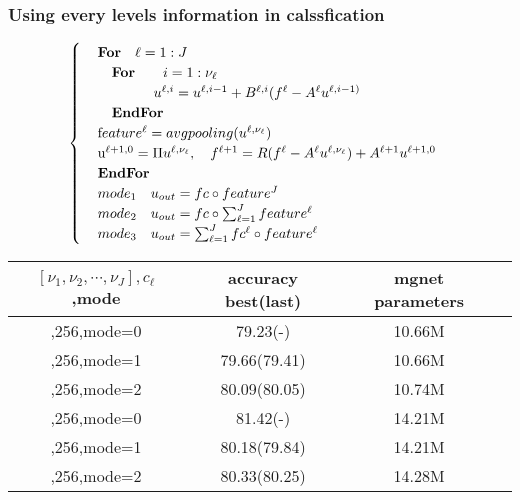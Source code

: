 \subsubsection{Using every levels information in calssfication}
\begin{equation}\label{eq:densenet}
\begin{cases}
\quad\text{\bf For}\quad \ell = 1:J\\
\quad\quad\text{\bf For}\quad\quad i = 1: \nu_{\ell}\\
\quad\text\quad\quad\quad\quad u^{\ell,i} = u^{\ell,i-1} + B^{\ell,i}(f^{\ell}-A^{\ell}u^{\ell,i-1)}\\
\quad\quad\text{\bf EndFor} \\
\quad\text feature^{\ell} = avgpooling(u^{\ell,\nu_{\ell}})\\
\quad\text u^{\ell+1,0}=\Pi u^{\ell,\nu_{\ell}},\quad f^{\ell+1}=R(f^{\ell}-A^{\ell}u^{\ell,\nu_{\ell}})+A^{\ell+1}u^{\ell+1,0}\\
\quad\text{\bf EndFor} \\
\quad mode_1 \quad u_{out}=fc\circ feature^{J}\\
\quad mode_2 \quad u_{out}=fc\circ \sum_{\ell=1}^{J}feature^{\ell}\\
\quad mode_3 \quad u_{out}= \sum_{\ell=1}^{J}fc^{\ell}\circ feature^{\ell}\\
\end{cases}
\end{equation}

\begin{table}[!htbp]
	\begin{center}
			\begin{tabular}{|c|c|c|c|}
                \hline
				$[\nu_1,\nu_2,\cdots,\nu_J], c_\ell$,mode   &  accuracy best(last)  & mgnet parameters \tabularnewline
				\hline		
				[2,2,2,2],256,mode=0                       &  79.23(-)             &     10.66M        \tabularnewline
				\hline
                [2,2,2,2],256,mode=1                       &  79.66(79.41)         &     10.66M        \tabularnewline
                \hline
                [2,2,2,2],256,mode=2                       &  80.09(80.05)         &     10.74M        \tabularnewline
				\hline
                [8,2,2,2],256,mode=0                       &  81.42(-)             &     14.21M        \tabularnewline
				\hline
                [8,2,2,2],256,mode=1                       &  80.18(79.84)         &     14.21M        \tabularnewline
                \hline
                [8,2,2,2],256,mode=2                       &  80.33(80.25)         &     14.28M        \tabularnewline
				\hline
			\end{tabular}
	\end{center}
\end{table}

